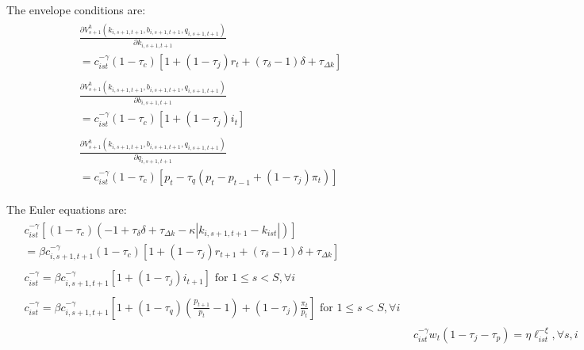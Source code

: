 \documentclass[letterpaper,12pt]{article}
\theoremstyle{definition}
\numberwithin{equation}{section}
\begin{document}
\begin{spacing}{1.5}
      The envelope conditions are:
      \begin{align}
      \begin{split}
      & \frac{\partial V^h_{s+1}(k_{i,s+1,t+1},b_{i,s+1,t+1},q_{i,s+1,t+1})}{\partial k_{i,s+1,t+1}} \\
      & = c_{ist}^{-\gamma}(1-\tau_c)\left[ 1 + (1-\tau_j)r_t + (\tau_\delta -1)\delta + \tau_{\Delta k} \right]
      \end{split} \nonumber \\  
      \begin{split}
      & \frac{\partial V^h_{s+1}(k_{i,s+1,t+1},b_{i,s+1,t+1},q_{i,s+1,t+1})}{\partial b_{i,s+1,t+1}} \\
      & = c_{ist}^{-\gamma}(1-\tau_c)\left[ 1+(1-\tau_j)i_t \right]
      \end{split} \nonumber \\
      \begin{split}
      &\frac{\partial V^h_{s+1}(k_{i,s+1,t+1},b_{i,s+1,t+1},q_{i,s+1,t+1})}{\partial q_{i,s+1,t+1}} \\
      & = c_{ist}^{-\gamma}(1-\tau_c)\left[ p_t - \tau_q(p_t-p_{t-1} + (1-\tau_j)\pi_t) \right]
      \end{split} \nonumber
      \end{align}

      The Euler equations are:
      \begin{align}
      \begin{split}
      & c_{ist}^{-\gamma}\left[(1-\tau_c)\left(-1+\tau_\delta \delta + \tau_{\Delta k} - \kappa \left|k_{i,s+1,t+1} - k_{ist} \right|\right)\right] \\
      & = \beta c_{i,s+1,t+1}^{-\gamma}(1-\tau_c)\left[ 1 + (1-\tau_j)r_{t+1} + (\tau_\delta -1)\delta + \tau_{\Delta k} \right]
      \end{split} \label{Macro_CorpTax_Euler1}\\
      \begin{split}
      & c_{ist}^{-\gamma} = \beta c_{i,s+1,t+1}^{-\gamma} \left[ 1+(1-\tau_j)i_{t+1} \right] \text{     for } 1\le s<S,\forall i 
      \end{split} \label{Macro_CorpTax_Euler2}\\
      \begin{split}
      & c_{ist}^{-\gamma} = \beta c_{i,s+1,t+1}^{-\gamma}\left[ 1 + (1 - \tau_q)(\tfrac{p_{t+1}}{p_t}-1) + (1-\tau_j)\tfrac{\pi_t}{p_t} \right] \text{     for } 1\le s<S,\forall i 
      \end{split} \label{Macro_CorpTax_Euler3}\\
      & c_{ist}^{-\gamma} w_t(1-\tau_j - \tau_p) = \eta \ell_{ist}^{-\xi}, \forall s,i \label{Macro_CorpTax_Euler4}
      \end{align}


\end{spacing}
\end{document}
